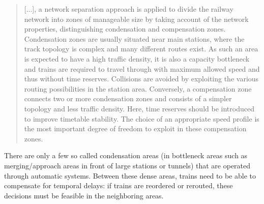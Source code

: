 \documentclass{article}
\begin{document}
%
\begin{quote}
    [...], a network separation approach is applied to divide the railway network into zones of manageable size by taking account of the network properties, distinguishing condensation and compensation zones. Condensation zones are usually situated near main stations, where the track topology is complex and many different routes exist. As such an area is expected to have a high traffic density, it is also a capacity bottleneck and trains are required to travel through with maximum allowed speed and thus without time reserves. Collisions are avoided by exploiting the various routing possibilities in the station area. Conversely, a compensation zone connects two or more condensation zones and consists of a simpler topology and less traffic density. Here, time reserves should be introduced to improve timetable stability. The choice of an appropriate speed profile is the most important degree of freedom to exploit in these compensation zones. \cite{caimi2009}
\end{quote}

 There are only a few so called condensation areas \cite{caimi2009} (in bottleneck areas such as merging/approach areas in front of large stations or tunnels) that are operated through automatic systems. Between these dense areas, trains need to be able to compensate for temporal delays: if trains are reordered or rerouted, these decisions must be feasible in the neighboring areas.
\end{document}
